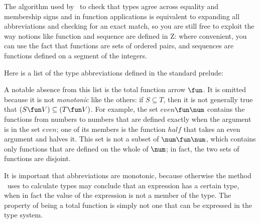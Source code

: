{{The algorithm used by \fuzz\ to check that types agree across
equality and membership signs and in function applications is
equivalent to expanding all abbreviations and checking for an exact
match, so you are still free to exploit the way notions like
function and sequence are defined in Z: where convenient, you can
use the fact that functions are sets of ordered pairs, and sequences
are functions defined on a segment of the integers.

Here is a list of the type abbreviations defined in the standard
prelude:
A notable absence from this list is the total function arrow
$\fun$.  It is omitted because it is not {\em
monotonic\/} like the
others: if $S
\subseteq T$, then it is not generally true that $(S \fun V)
\subseteq (T \fun V)$.  For example, the set $even \fun \num$
contains the functions from numbers to numbers that are
defined exactly when the argument is in the set $even$; one of its
members is the function $half$ that takes an even argument and
halves it.  This set is not a subset of $\num \fun \num$, which
contains only functions that are defined on the whole of $\num$; in
fact, the two sets of functions are disjoint.

It is important that abbreviations are monotonic, because otherwise
the method \fuzz\ uses to calculate types may conclude that an
expression has a certain type, when in fact the value of the
expression is not a member of the type.  The property of being a
total function is simply not one that can be expressed in the type
system.

}}
